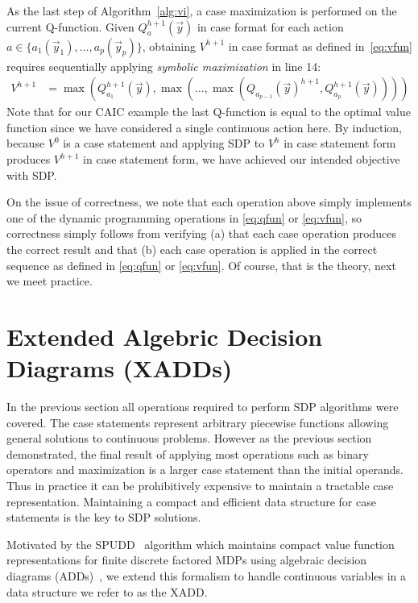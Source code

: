 \documentclass[twoside,11pt]{article}
\begin{document}
As the last step of Algorithm~\ref{alg:vi}, a case maximization is performed on the current Q-function. Given $Q_a^{h+1}(\vec{y})$ in
case format for each action $a \in\{a_{1}(\vec{y}_1), \ldots , a_{p}(\vec{y}_p)\}$, obtaining
$V^{h+1}$ in case format as defined in~\eqref{eq:vfun} requires
sequentially applying
\emph{symbolic maximization} in line 14:
\begin{align*}
V^{h+1} & = 
\max(Q_{a_1}^{h+1}(\vec{y}),\max(\ldots,\max(Q_{a_{p-1}}(\vec{y})^{h+1},Q_{a_p}^{h+1}(\vec{y}))))
\end{align*}
Note that for our \textsc{CAIC} example the last Q-function is equal to the optimal value function since we have considered a single continuous action here. %
By induction, because $V^0$ is a case statement and applying
SDP to $V^h$ in case statement form produces $V^{h+1}$ in case
statement form, we have achieved our intended
objective with SDP. 

On the issue of correctness,
we note that each operation above simply implements one of the
dynamic programming operations in \eqref{eq:qfun} or \eqref{eq:vfun}, 
so correctness simply follows from verifying (a) that each case
operation produces the correct result and that (b) each case operation
is applied in the correct sequence as defined in \eqref{eq:qfun} or 
\eqref{eq:vfun}.  
Of course, that is the theory, next we meet practice.

\section{Extended Algebric Decision Diagrams (XADDs)} \label{XADD}

In the previous section all operations required to perform SDP algorithms were covered. The case statements represent arbitrary piecewise functions allowing general solutions to continuous problems. 
However as the previous section demonstrated, the final result of applying most operations such as binary operators and maximization is a larger case statement than the initial operands. Thus in practice it can be prohibitively expensive to maintain a tractable case representation. Maintaining a compact and efficient data structure for case statements is the key to SDP solutions.

Motivated by the SPUDD~\cite{spudd} algorithm which
maintains compact value function representations for finite discrete
factored MDPs using algebraic decision diagrams (ADDs)~\cite{bahar93add},
we extend this formalism to handle continuous variables in a data
structure we refer to as the XADD. 
\end{document}

